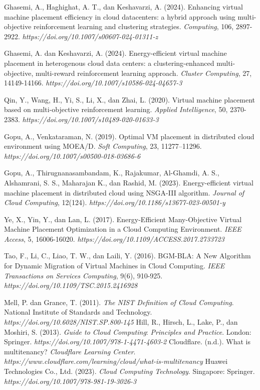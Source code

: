 \begin{thebibliography}{99}
	Ghasemi, A., Haghighat, A. T., dan Keshavarzi, A. (2024). Enhancing virtual machine placement efficiency in cloud datacenters: a hybrid approach using multi-objective reinforcement learning and clustering strategies. \textit{Computing}, 106, 2897-2922. \textit{https://doi.org/10.1007/s00607-024-01311-z}
	
	Ghasemi, A. dan Keshavarzi, A. (2024). Energy-efficient virtual machine placement in heterogenous cloud data centers: a clustering-enhanced multi-objective, multi-reward reinforcement learning approach. \textit{Cluster Computing}, 27, 14149-14166. \textit{https://doi.org/10.1007/s10586-024-04657-3}
	
	Qin, Y., Wang, H., Yi, S., Li, X., dan Zhai, L. (2020). Virtual machine placement based on multi-objective reinforcement learning. \textit{Applied Intelligence}, 50, 2370-2383. \textit{https://doi.org/10.1007/s10489-020-01633-3} 
	
	Gopu, A., Venkataraman, N. (2019). Optimal VM placement in distributed cloud environment using MOEA/D. \textit{Soft Computing}, 23, 11277–11296. \textit{https://doi.org/10.1007/s00500-018-03686-6}
	
	Gopu, A., Thirugnanasambandam, K., Rajakumar, Al-Ghamdi, A. S., Alshamrani, S. S., Maharajan K., dan Rashid, M. (2023). Energy-efficient virtual machine placement in distributed cloud using NSGA-III algorithm. \textit{Journal of Cloud Computing}, 12(124). \textit{https://doi.org/10.1186/s13677-023-00501-y} 
	
	Ye, X., Yin, Y., dan Lan, L. (2017). Energy-Efficient Many-Objective Virtual Machine Placement Optimization in a Cloud Computing Environment. \textit{IEEE Access}, 5, 16006-16020. \textit{https://doi.org/10.1109/ACCESS.2017.2733723}
	
	Tao, F., Li, C., Liao, T. W., dan Laili, Y. (2016). BGM-BLA: A New Algorithm for Dynamic Migration of Virtual Machines in Cloud Computing. \textit{IEEE Transactions on Services Computing}, 9(6), 910-925. \textit{https://doi.org/10.1109/TSC.2015.2416928}



Mell, P. dan Grance, T. (2011). \textit{The NIST Definition of Cloud Computing}. National Institute of Standards and Technology. \textit{https://doi.org/10.6028/NIST.SP.800-145} 
Hill, R., Hirsch, L., Lake, P., dan Moshiri, S. (2013). \textit{Guide to Cloud Computing}: \textit{Principles and Practice}. London: Springer. \textit{https://doi.org/10.1007/978-1-4471-4603-2}
Cloudflare. (n.d.). What is multitenancy? \textit{Cloudflare Learning Center}. \textit{https://www.cloudflare.com/learning/cloud/what-is-multitenancy}
Huawei Technologies Co., Ltd. (2023). \textit{Cloud Computing Technology}. Singapore: Springer. \textit{https://doi.org/10.1007/978-981-19-3026-3}


\end{thebibliography}
